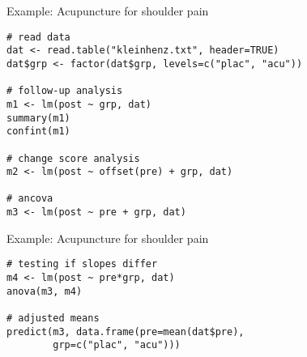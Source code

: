 \documentclass{beamer}
\begin{document}
{

\begin{frame}[fragile]{Example: Acupuncture for shoulder pain}
\begin{lstlisting}
# read data
dat <- read.table("kleinhenz.txt", header=TRUE)
dat$grp <- factor(dat$grp, levels=c("plac", "acu"))

# follow-up analysis
m1 <- lm(post ~ grp, dat)
summary(m1)
confint(m1)

# change score analysis
m2 <- lm(post ~ offset(pre) + grp, dat)

# ancova
m3 <- lm(post ~ pre + grp, dat)
\end{lstlisting}
\end{frame}

\begin{frame}[fragile]{Example: Acupuncture for shoulder pain}
\begin{lstlisting}
# testing if slopes differ
m4 <- lm(post ~ pre*grp, dat)
anova(m3, m4)

# adjusted means
predict(m3, data.frame(pre=mean(dat$pre),
        grp=c("plac", "acu")))
\end{lstlisting}
\end{frame}


}
\end{document}
